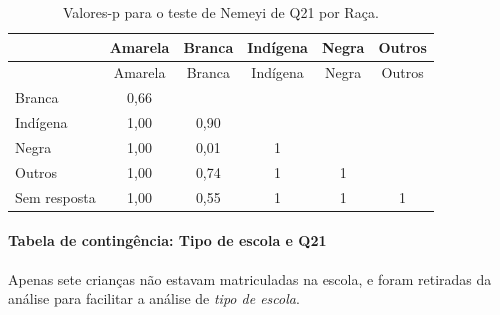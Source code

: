 \documentclass[]{article}
\let\oldparagraph\paragraph
\renewcommand{\paragraph}[1]{\oldparagraph{#1}\mbox{}}
\begin{document}
\begin{longtable}[]{@{}lccccc@{}}
\caption{\label{tab:unnamed-chunk-465}Valores-p para o teste de Nemeyi de Q21 por Raça.}\tabularnewline
\toprule
& Amarela & Branca & Indígena & Negra & Outros\tabularnewline
\midrule
\endfirsthead
\toprule
& Amarela & Branca & Indígena & Negra & Outros\tabularnewline
\midrule
\endhead
Branca & 0,66 & & & &\tabularnewline
Indígena & 1,00 & 0,90 & & &\tabularnewline
Negra & 1,00 & 0,01 & 1 & &\tabularnewline
Outros & 1,00 & 0,74 & 1 & 1 &\tabularnewline
Sem resposta & 1,00 & 0,55 & 1 & 1 & 1\tabularnewline
\bottomrule
\end{longtable}

\cleardoublepage

\hypertarget{tabela-de-continguxeancia-tipo-de-escola-e-q21}{%
\paragraph{Tabela de contingência: Tipo de escola e Q21}\label{tabela-de-continguxeancia-tipo-de-escola-e-q21}}

Apenas sete crianças não estavam matriculadas na escola, e foram retiradas da análise para facilitar a análise de \emph{tipo de escola}.
\end{document}
